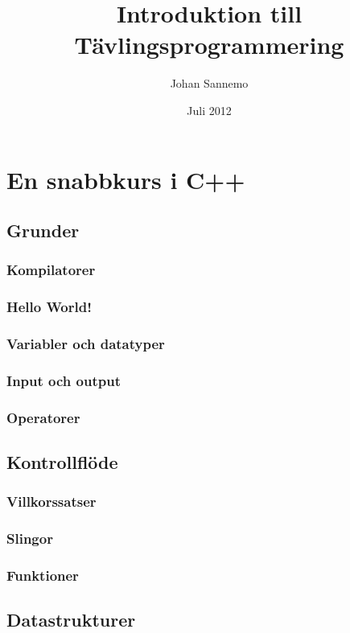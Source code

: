 \documentclass[10pt,a4paper]{report}
\author{Johan Sannemo}
\title{Introduktion till Tävlingsprogrammering}
\date{Juli 2012}
\begin{document}
\maketitle
\tableofcontents

\chapter{En snabbkurs i C++}

\section{Grunder}

\subsection{Kompilatorer}

\subsection{Hello World!}

\subsection{Variabler och datatyper}

\subsection{Input och output}

\subsection{Operatorer}


\section{Kontrollflöde}
\subsection{Villkorssatser}

\subsection{Slingor}

\subsection{Funktioner}

\section{Datastrukturer}
\end{document}
